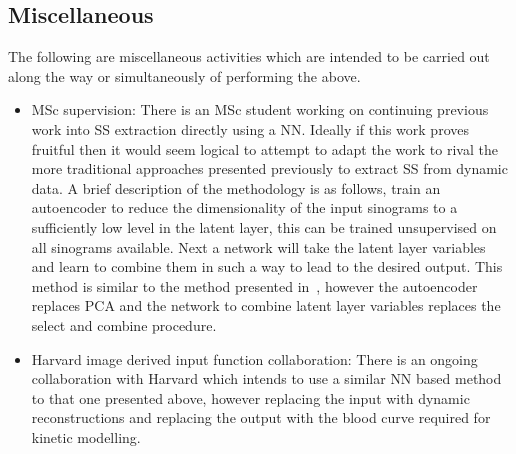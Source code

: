         \subsection{Miscellaneous} \label{sec:future_work_miscellaneous}
            The following are miscellaneous activities which are intended to be carried out along the way or simultaneously of performing the above.
            \begin{itemize}
                \item \gls{MSc} supervision: There is an \gls{MSc} student working on continuing previous work into \gls{SS} extraction directly using a \gls{NN}. Ideally if this work proves fruitful then it would seem logical to attempt to adapt the work to rival the more traditional approaches presented previously to extract \gls{SS} from dynamic data. A brief description of the methodology is as follows, train an autoencoder to reduce the dimensionality of the input sinograms to a sufficiently low level in the latent layer, this can be trained unsupervised on all sinograms available. Next a network will take the latent layer variables and learn to combine them in such a way to lead to the desired output. This method is similar to the method presented in~, however the autoencoder replaces \gls{PCA} and the network to combine latent layer variables replaces the select and combine procedure.
    
                \item Harvard image derived input function collaboration: There is an ongoing collaboration with Harvard which intends to use a similar \gls{NN} based method to that one presented above, however replacing the input with dynamic reconstructions and replacing the output with the blood curve required for kinetic modelling.
            \end{itemize}

